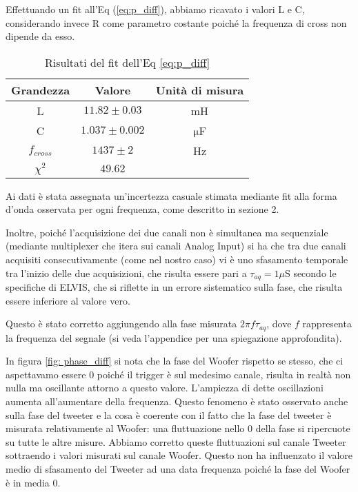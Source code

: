 \documentclass[../Relazione_circuiti]{subfiles}
\begin{document}
  
Effettuando un fit all'Eq (\ref{eq:p_diff}), abbiamo ricavato i valori L e C, considerando invece R come parametro costante poiché la frequenza di cross non dipende da esso.


\begin{table}[H]
\centering

\begin{tabular}{c | c | c}
Grandezza & Valore & Unità di misura \\
\hline
L & $ 11.82 \pm 0.03 $ & mH \\
C & $ 1.037 \pm 0.002 $ & $\mathrm{\mu}$F \\
$f_{cross}$ & $ 1437 \pm 2$ & Hz \\
$\chi^2$ & $49.62$ & $\;$

\end{tabular}
\caption{Risultati del fit dell'Eq \ref{eq:p_diff}}
\label{tab: fit_phase}

\end{table}
Ai dati è stata assegnata un'incertezza casuale stimata mediante fit alla forma d'onda osservata per ogni frequenza, come descritto in sezione 2. 

Inoltre, poiché l'acquisizione dei due canali non è simultanea ma sequenziale (mediante multiplexer che itera sui canali Analog Input) si ha che tra due canali acquisiti consecutivamente (come nel nostro caso) vi è uno sfasamento temporale tra l'inizio delle due acquisizioni, che risulta essere pari a $\tau_{aq}=1 \mu \mathrm{S}$ secondo le specifiche di ELVIS, che si riflette in un errore sistematico sulla fase, che risulta essere inferiore al valore vero.

Questo è stato corretto aggiungendo alla fase misurata  $ 2 \pi f \tau_{aq}$, dove $f$ rappresenta la frequenza del segnale (si veda l'appendice per una spiegazione approfondita).

In figura \ref{fig: phase_diff} si nota che la fase del Woofer rispetto se stesso, che ci aspettavamo essere 0 poiché il trigger è sul medesimo canale, risulta in realtà non nulla ma oscillante attorno a questo valore. L'ampiezza di dette oscillazioni aumenta all'aumentare della frequenza. Questo fenomeno è stato osservato anche sulla fase del tweeter e la cosa è coerente con il fatto che la fase del tweeter è misurata relativamente al Woofer: una fluttuazione nello 0 della fase si ripercuote su tutte le altre misure. Abbiamo corretto queste fluttuazioni sul canale Tweeter sottraendo i valori misurati sul canale Woofer. Questo non ha influenzato il valore medio di sfasamento del Tweeter ad una data frequenza poiché la fase del Woofer è in media 0.
\end{document}
